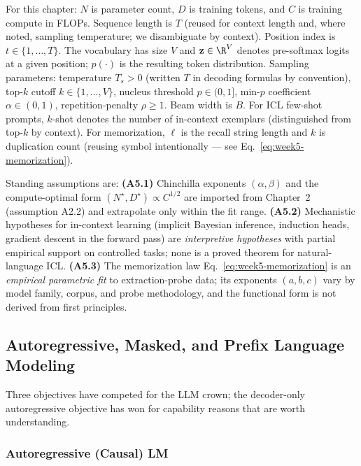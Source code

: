 \begin{notationbox}
For this chapter: $N$ is parameter count, $D$ is training tokens, and
$C$ is training compute in FLOPs. Sequence length is $T$ (reused for
context length and, where noted, sampling temperature; we disambiguate
by context). Position index is $t \in \{1, \ldots, T\}$. The
vocabulary has size $V$ and $\mathbf{z} \in \R^{V}$ denotes pre-softmax
logits at a given position; $p(\cdot)$ is the resulting token
distribution. Sampling parameters: temperature $T_s > 0$ (written $T$
in decoding formulas by convention), top-$k$ cutoff
$k \in \{1, \ldots, V\}$, nucleus threshold $p \in (0, 1]$, min-$p$
coefficient $\alpha \in (0, 1)$, repetition-penalty $\rho \ge 1$.
Beam width is $B$. For ICL few-shot prompts, $k$-shot denotes the
number of in-context exemplars (distinguished from top-$k$ by
context). For memorization, $\ell$ is the recall string length and
$k$ is duplication count (reusing symbol intentionally — see
Eq.~\eqref{eq:week5-memorization}).

Standing assumptions are:
\textbf{(A5.1)} Chinchilla exponents $(\alpha, \beta)$ and the
compute-optimal form $(N^\star, D^\star) \propto C^{1/2}$ are imported
from Chapter~2 (assumption A2.2) and extrapolate only within the fit
range.
\textbf{(A5.2)} Mechanistic hypotheses for in-context learning
(implicit Bayesian inference, induction heads, gradient descent in
the forward pass) are \emph{interpretive hypotheses} with partial
empirical support on controlled tasks; none is a proved theorem for
natural-language ICL.
\textbf{(A5.3)} The memorization law Eq.~\eqref{eq:week5-memorization}
is an \emph{empirical parametric fit} to extraction-probe data; its
exponents $(a, b, c)$ vary by model family, corpus, and probe
methodology, and the functional form is not derived from first
principles.
\end{notationbox}

\subsection{Autoregressive, Masked, and Prefix Language Modeling}

Three objectives have competed for the LLM crown; the decoder-only
autoregressive objective has won for capability reasons that are
worth understanding.

\subsubsection{Autoregressive (Causal) LM}

